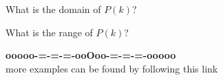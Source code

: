 \documentclass{ximera}
\begin{document}
\begin{example}
\begin{question}
What is the domain of $P(k)$?

\begin{multipleChoice}
  \choice {$[-5,0] \cup [1,5]$}
  \choice {$[-5,5]$}
  \choice {$(-5,0] \cup [1,5)$}
  \choice [correct]{$[-5,0) \cup (1,5]$}
  \choice {$[-5,0), (1,5]$}
\end{multipleChoice}

\end{question}






\begin{question}

What is the range of $P(k)$?

\begin{multipleChoice}
  \choice {$[-6,9]$}
  \choice [correct]{$[-6,-2) \cup [0,9]$}
  \choice {$[-6,-2) \cup [0,5)$}
  \choice {$[-6,-2), [0,9]$}
\end{multipleChoice}

\end{question}






\end{example}













\begin{center}
\textbf{\textcolor{green!50!black}{ooooo-=-=-=-ooOoo-=-=-=-ooooo}} \\

more examples can be found by following this link\\ 

\end{center}
\end{document}
